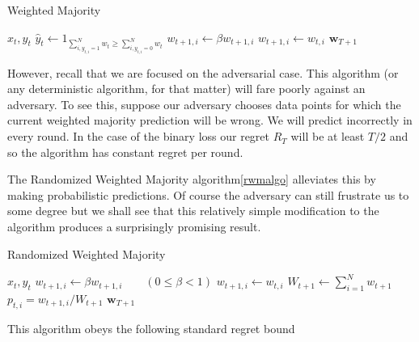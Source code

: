 \documentclass{article}
\begin{document}
\begin{algorithm}[H]
\caption{Weighted Majority}
\label{wmalgo}
\begin{algorithmic}[1]
\EndFor
{}
    \State {} $x_t , y_t$
    \State $\hat y_t \leftarrow 1_{\sum_{i, y_{t,i}=1}^N w_t \ge \sum_{i, y_{t,i}=0}^N w_t}$
                \State $w_{t+1,i} \leftarrow \beta w_{t+1,i}$
            \Else
                \State $w_{t+1,i} \leftarrow w_{t,i}$
            \EndIf
        \EndFor
    \EndIf
\EndFor
\State \Return $\textbf{w}_{T+1}$
\end{algorithmic}
\end{algorithm}

However, recall that we are focused on the adversarial case. This algorithm (or any deterministic algorithm, for that matter) will fare poorly against an adversary. To see this, suppose our adversary chooses data points for which the current weighted majority prediction will be wrong. We will predict incorrectly in every round. In the case of the binary loss our regret $R_T$ will be at least $T/2$ and so the algorithm has constant regret per round.

The Randomized Weighted Majority algorithm\autoref{rwmalgo} alleviates this by making probabilistic predictions. Of course the adversary can still frustrate us to some degree but we shall see that this relatively simple modification to the algorithm produces a surprisingly promising result.

\begin{algorithm}[H]
\caption{Randomized Weighted Majority}
\label{rwmalgo}
\begin{algorithmic}[1]
\EndFor
{}
    \State {} $x_t, y_t$
            \State $w_{t+1,i} \leftarrow \beta w_{t+1,i} \quad\quad(0 \le \beta < 1)$
        \Else
            \State $w_{t+1,i} \leftarrow w_{t,i}$
        \EndIf
    \EndFor
    \State $W_{t+1} \leftarrow \sum_{i=1}^N w_{t+1}$
        \State $p_{t,i} = w_{t+1, i}/W_{t+1}$
    \EndFor
\EndFor
\State \Return $\textbf{w}_{T+1}$
\end{algorithmic}
\end{algorithm}

This algorithm obeys the following standard regret bound \cite{mohri2012foundations}
\end{document}
